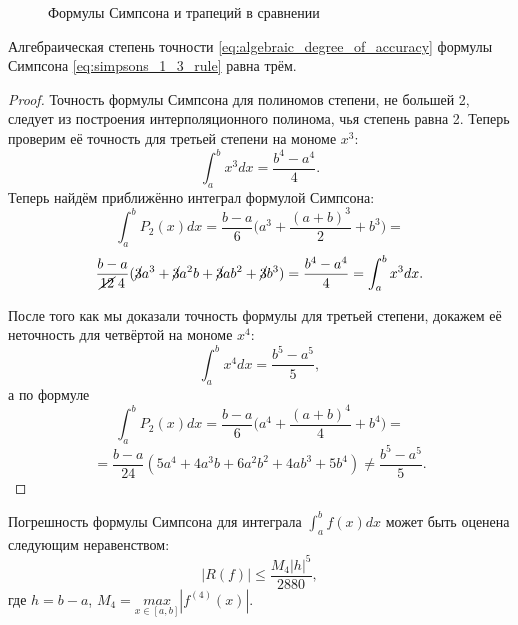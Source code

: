 \documentclass[../main.tex]{subfile}
\begin{document}
\begin{figure}[ht]
	\caption*{Формулы Симпсона и трапеций в сравнении}
\end{figure}

\begin{lemma}
	Алгебраическая степень точности \eqref{eq:algebraic_degree_of_accuracy}
	формулы Симпсона \eqref{eq:simpsons_1_3_rule} равна трём.
\end{lemma}

\begin{proof}
	Точность формулы Симпсона для полиномов степени, не большей 2, следует
	из построения интерполяционного полинома, чья степень равна 2. Теперь
	проверим её точность для третьей степени на мономе $x^3$:
	\[\int_a^b x^3dx=\frac{b^4-a^4}{4}.\]
	Теперь найдём приближённо интеграл формулой Симпсона:
	\[\int_a^b P_2(x)dx=\frac{b-a}{6}\Big(a^3+\frac{(a+b)^3}{2}+b^3\Big)=\]
	\[\frac{b-a}{\cancel{12}\;4}(\cancel{3}a^3+\cancel{3}a^2b+\cancel{3}ab^2
	+\cancel{3}b^3)=\frac{b^4-a^4}{4}=\int_a^b x^3dx.\]

	После того как мы доказали точность формулы для третьей степени, докажем
	её неточность для четвёртой на мономе $x^4$:
	\[\int_a^b x^4dx=\frac{b^5-a^5}{5},\]
	а по формуле
	\[\int_a^b P_2(x)dx=\frac{b-a}{6}\Big(a^4+\frac{(a+b)^4}{4}+b^4\Big)=\]
	\[=\frac{b-a}{24}(5a^4+4a^3b+6a^2b^2+4ab^3+5b^4)\ne\frac{b^5-a^5}{5}.\]
\end{proof}

\begin{theorem}
	Погрешность формулы Симпсона для интеграла $\int_a^b f(x)dx$ может быть
	оценена следующим неравенством:
	\[\boxed{|R(f)|\le\frac{M_4|h|^5}{2880}},\]
	где $h=b-a$, $M_4=\underset{x\in[a,b]}{max}|f^{(4)}(x)|.$
\end{theorem}
\end{document}
